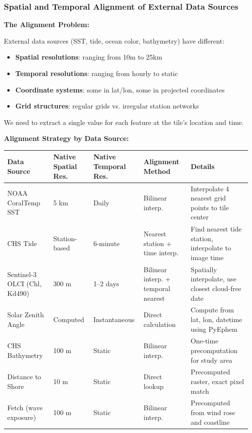 \documentclass[11pt]{article}
\begin{document}
\subsubsection{Spatial and Temporal Alignment of External Data Sources}

\textbf{The Alignment Problem:}

External data sources (SST, tide, ocean color, bathymetry) have different:
\begin{itemize}
    \item \textbf{Spatial resolutions}: ranging from 10m to 25km
    \item \textbf{Temporal resolutions}: ranging from hourly to static
    \item \textbf{Coordinate systems}: some in lat/lon, some in projected coordinates
    \item \textbf{Grid structures}: regular grids vs. irregular station networks
\end{itemize}

We need to extract a single value for each feature at the tile's location and time.

\textbf{Alignment Strategy by Data Source:}

\begin{center}
\small
\begin{tabular}{p{2.2cm}p{2cm}p{2cm}p{2cm}p{4cm}}
\toprule
\textbf{Data Source} & \textbf{Native Spatial Res.} & \textbf{Native Temporal Res.} & \textbf{Alignment Method} & \textbf{Details} \\
\midrule
NOAA CoralTemp SST & 5 km & Daily & Bilinear interp. & Interpolate 4 nearest grid points to tile center \\
\addlinespace
CHS Tide & Station-based & 6-minute & Nearest station + time interp. & Find nearest tide station, interpolate to image time \\
\addlinespace
Sentinel-3 OLCI (Chl, Kd490) & 300 m & 1--2 days & Bilinear interp. + temporal nearest & Spatially interpolate, use closest cloud-free date \\
\addlinespace
Solar Zenith Angle & Computed & Instantaneous & Direct calculation & Compute from lat, lon, datetime using PyEphem \\
\addlinespace
CHS Bathymetry & 100 m & Static & Bilinear interp. & One-time precomputation for study area \\
\addlinespace
Distance to Shore & 10 m & Static & Direct lookup & Precomputed raster, exact pixel match \\
\addlinespace
Fetch (wave exposure) & 100 m & Static & Bilinear interp. & Precomputed from wind rose and coastline \\
\bottomrule
\end{tabular}
\end{center}
\end{document}
